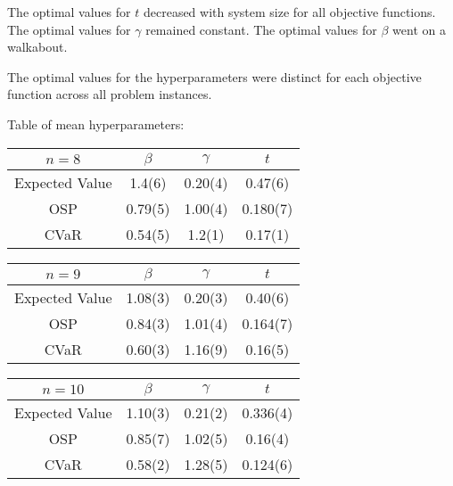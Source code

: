 The optimal values for $t$ decreased with system size for all objective functions. The optimal values for $\gamma$ remained constant. The optimal values for $\beta$ went on a walkabout.

The optimal values for the hyperparameters were distinct for each objective function across all problem instances.

Table of mean hyperparameters:

\begin{tabular}{c||c|c|c}
    $n=8$          & $\beta$ & $\gamma$ & $t$     \\\hline\hline
    Expected Value & 1.4(6)  & 0.20(4)  & 0.47(6) \\\hline
    OSP            & 0.79(5) & 1.00(4)  & 0.180(7)\\\hline
    CVaR           & 0.54(5) & 1.2(1)   & 0.17(1) 
\end{tabular}

\begin{tabular}{c|c|c|c}
    $n=9$          & $\beta$ & $\gamma$ & $t$     \\\hline
    Expected Value & 1.08(3) & 0.20(3)  & 0.40(6) \\\hline
    OSP            & 0.84(3) & 1.01(4)  & 0.164(7)\\\hline
    CVaR           & 0.60(3) & 1.16(9)  & 0.16(5) 
\end{tabular}

\begin{tabular}{c|c|c|c}
    $n=10$         & $\beta$ & $\gamma$ & $t$     \\\hline
    Expected Value & 1.10(3) & 0.21(2)  & 0.336(4)\\\hline
    OSP            & 0.85(7) & 1.02(5)  & 0.16(4) \\\hline
    CVaR           & 0.58(2) & 1.28(5)  & 0.124(6)
\end{tabular}
